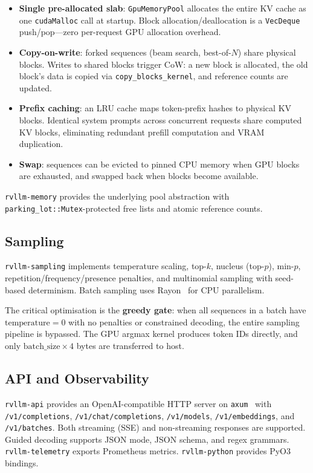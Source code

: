 \documentclass[11pt,a4paper]{article}
\begin{document}
\begin{itemize}
  \item \textbf{Single pre-allocated slab}: \texttt{GpuMemoryPool} allocates the
        entire KV cache as one \texttt{cudaMalloc} call at startup. Block
        allocation/deallocation is a \texttt{VecDeque} push/pop---zero per-request
        GPU allocation overhead.
  \item \textbf{Copy-on-write}: forked sequences (beam search, best-of-$N$) share
        physical blocks. Writes to shared blocks trigger CoW: a new block is allocated,
        the old block's data is copied via \texttt{copy\_blocks\_kernel}, and reference
        counts are updated.
  \item \textbf{Prefix caching}: an LRU cache maps token-prefix hashes to physical
        KV blocks. Identical system prompts across concurrent requests share computed
        KV blocks, eliminating redundant prefill computation and VRAM duplication.
  \item \textbf{Swap}: sequences can be evicted to pinned CPU memory when GPU blocks
        are exhausted, and swapped back when blocks become available.
\end{itemize}

\texttt{rvllm-memory} provides the underlying pool abstraction with
\texttt{parking\_lot::Mutex}-protected free lists and atomic reference counts.

\subsection{Sampling}

\texttt{rvllm-sampling} implements temperature scaling, top-$k$, nucleus (top-$p$),
min-$p$, repetition/frequency/presence penalties, and multinomial sampling with
seed-based determinism. Batch sampling uses Rayon~\cite{rayon2023} for CPU parallelism.

The critical optimisation is the \textbf{greedy gate}: when all sequences in a batch
have $\text{temperature} = 0$ with no penalties or constrained decoding, the entire
sampling pipeline is bypassed. The GPU argmax kernel produces token IDs directly,
and only $\text{batch\_size} \times 4$ bytes are transferred to host.

\subsection{API and Observability}

\texttt{rvllm-api} provides an OpenAI-compatible HTTP server on
\texttt{axum}~\cite{axum2023} with \texttt{/v1/completions},
\texttt{/v1/chat/completions}, \texttt{/v1/models}, \texttt{/v1/embeddings}, and
\texttt{/v1/batches}. Both streaming (SSE) and non-streaming responses are supported.
Guided decoding supports JSON mode, JSON schema, and regex grammars.
\texttt{rvllm-telemetry} exports Prometheus metrics. \texttt{rvllm-python} provides
PyO3 bindings.
\end{document}

